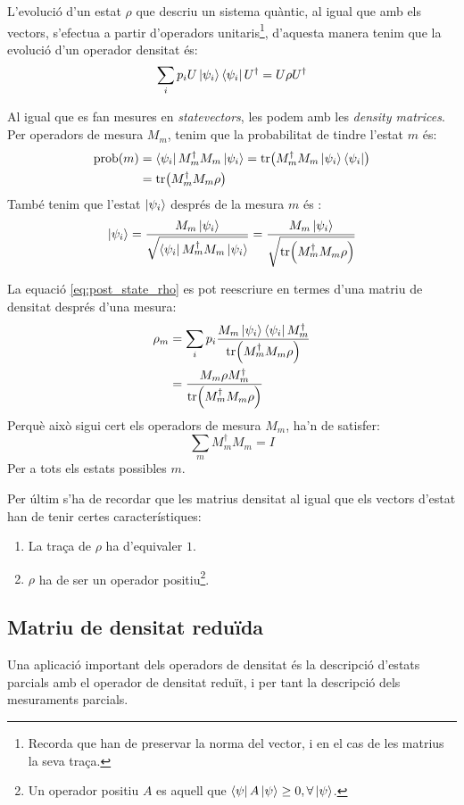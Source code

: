 L'evolució d'un estat $\rho$ que descriu un sistema quàntic, al igual que amb els vectors, s'efectua a partir d'operadors unitaris\footnote{Recorda que han de preservar la norma del vector, i en el cas de les matrius la seva traça.}, d'aquesta manera tenim que la evolució d'un operador densitat és:
$$
\sum_i p_i U \ket{\psi_i}\bra{\psi_i} U^\dagger = U\rho U^\dagger 
$$

Al igual que es fan mesures en \textit{statevectors}, les podem amb les \textit{density matrices}. Per operadors de mesura $M_m$, tenim que la probabilitat de tindre l'estat $m$ és:
\begin{align*}
	\mathrm{prob}(m) &= \bra{\psi_i}M_m^\dagger M_m\ket{\psi_i} = \tr(M_m^\dagger M_m \ket{\psi_i}\bra{\psi_i})\\ &= \tr(M_m^\dagger M_m \rho)
\end{align*}
També tenim que l'estat $\ket{\psi_i}$ després de la mesura $m$ és \cite{QCandQI:density_matrix}:
\begin{equation}
	\ket{\psi_i} = \frac{M_m\ket{\psi_i}}{\sqrt{\bra{\psi_i}M_m^\dagger M_m \ket{\psi_i}}} = \frac{M_m\ket{\psi_i}}{\sqrt{\tr(M_m^\dagger M_m \rho)}}
	\label{eq:post_state_rho}
\end{equation}

La equació \ref{eq:post_state_rho} es pot reescriure en termes d'una matriu de densitat després d'una mesura:
\begin{align*}
	\rho_m &= \sum_i p_i \frac{M_m\ket{\psi_i}\bra{\psi_i}M_m^\dagger}{\tr(M_m^\dagger M_m \rho)} \\
	&= \frac{M_m\rho M_m^\dagger }{\tr(M_m^\dagger M_m\rho)}
\end{align*}
Perquè això sigui cert els operadors de mesura $M_m$, ha'n de satisfer: 
$$
\sum_m M_m^\dagger M_m = I
$$
Per a tots els estats possibles $m$.

Per últim s'ha de recordar que les matrius densitat al igual que els vectors d'estat han de tenir certes característiques: 
\begin{enumerate}
	\item La traça de $\rho$ ha d'equivaler $1$.
	\item $\rho$ ha de ser un operador positiu\footnote{Un operador positiu $A$ es aquell que $\bra{\psi}A\ket{\psi}\geq0, \forall \ket{\psi}$.}.
\end{enumerate}
\subsection{Matriu de densitat reduïda}
Una aplicació important dels operadors de densitat és la descripció d'estats parcials amb el operador de densitat reduït, i per tant la descripció dels mesuraments parcials. 

